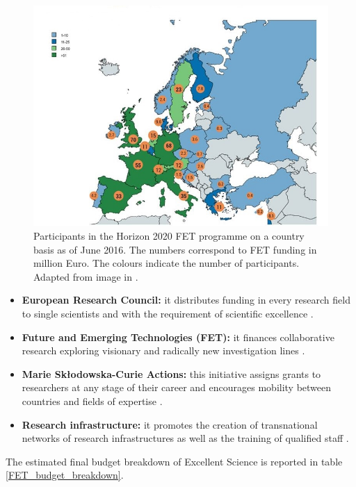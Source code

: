 \begin{figure}[!t] 
 \begin{center}
 \includegraphics[scale=0.43]{Images/Country_participation_in_H2020_FET_projects.jpg}
 \caption{Participants in the Horizon 2020 FET programme on a country basis as of June 2016. The numbers correspond to FET funding in million Euro. The colours indicate the number of participants. Adapted from image in \cite{FETParticipation}.}
 \label{Country_participation_in_H2020_FET_projects}
 \end{center}
\end{figure}

\begin{itemize}
 \item \textbf{European Research Council:} it distributes funding in every research field to single scientists and with the requirement of scientific excellence \cite{ERC}.  
 \item \textbf{Future and Emerging Technologies (FET):} it finances collaborative research exploring visionary and radically new investigation lines \cite{FET}. 
 \item \textbf{Marie Sk\l{}odowska-Curie Actions:} this initiative assigns grants to researchers at any stage of their career and encourages mobility between countries and fields of expertise \cite{MSCA}. 
 \item \textbf{Research infrastructure:} it promotes the creation of transnational networks of research infrastructures as well as the training of qualified staff \cite{ResearchInfrastructure}. 
\end{itemize}
The estimated final budget breakdown of Excellent Science is reported in table \ref{FET_budget_breakdown}.

